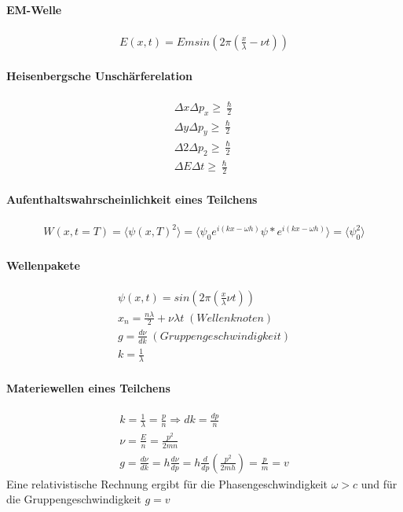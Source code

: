 \documentclass[10pt,a4paper]{article}
\begin{document}
\paragraph{EM-Welle}$\,$ \\
\begin{align}
E(x,t)= E m sin(2\pi(\frac{x}{\lambda}-\nu t))
\end{align}
\paragraph{Heisenbergsche Unschärferelation}$\,$ \\
\begin{align}
\Delta x \Delta p_x \geqslant \frac{\hslash}{2}\\
\Delta y \Delta p_y \geqslant \frac{\hslash}{2}\\
\Delta 2 \Delta p_2 \geqslant \frac{\hslash}{2}\\
\Delta E \Delta t \geqslant \frac{\hslash}{2}
\end{align}
\paragraph{Aufenthaltswahrscheinlichkeit eines Teilchens}$\,$ \\
\begin{align}
W(x,t=T)=\langle \psi(x,T)^2 \rangle = \langle\psi_0 e^{i(kx-\omega h)}\psi * e^{i(kx-\omega h)} \rangle = \langle \psi_0^2 \rangle 
\end{align}
\paragraph{Wellenpakete}$\,$ \\
\begin{align}
\psi(x,t)=sin(2\pi(\frac{x}{\lambda} \nu t))\\
x_n = \frac{n\lambda}{2}+\nu \lambda t \; (Wellenknoten)\\
g=\frac{d\nu}{d k} \; (Gruppengeschwindigkeit)\\
k=\frac{1}{\lambda}
\end{align}
\paragraph{Materiewellen eines Teilchens}$\,$ \\
\begin{align}
k=\frac{1}{\lambda}=\frac{p}{n} \Rightarrow dk = \frac{dp}{n}\\
\nu = \frac{E}{n} = \frac{p^2}{2mn}\\
g = \frac{d\nu}{dk} = h\frac{d\nu}{dp}=h \frac{d}{dp}(\frac{p^2}{2mh})= \frac{p}{m}=v
\end{align}
Eine relativistische Rechnung ergibt für die Phasengeschwindigkeit $\omega > c $ und für die Gruppengeschwindigkeit $g=v$\\
\end{document}
